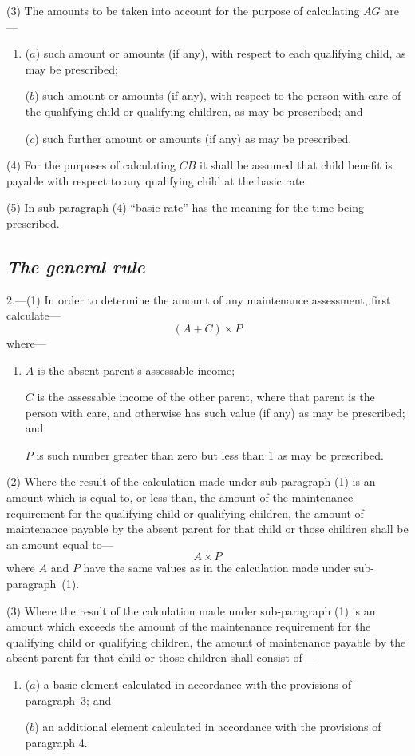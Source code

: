 \documentclass[12pt,a4paper]{article}
\begin{document}
(3) The amounts to be taken into account for the purpose of calculating $AG$ are—
\begin{enumerate}\item[]
($a$) such amount or amounts (if any), with respect to each qualifying child, as may be prescribed;

($b$) such amount or amounts (if any), with respect to the person with care of the qualifying child or qualifying children, as may be prescribed; and

($c$) such further amount or amounts (if any) as may be prescribed.
\end{enumerate}

(4) For the purposes of calculating $CB$ it shall be assumed that child benefit is payable with respect to any qualifying child at the basic rate.

(5) In sub-paragraph (4)  “basic rate” has the meaning for the time being prescribed.


\subsection*{\itshape The general rule}

2.---(1) In order to determine the amount of any maintenance assessment, first calculate—
\[
(A + C) \times P
\]
where—
\begin{enumerate}\item[]
    $A$ is the absent parent’s assessable income;

    $C$ is the assessable income of the other parent, where that parent is the person with care, and otherwise has such value (if any) as may be prescribed; and

    $P$ is such number greater than zero but less than 1 as may be prescribed. 
\end{enumerate}

(2) Where the result of the calculation made under sub-paragraph (1)  is an amount which is equal to, or less than, the amount of the maintenance requirement for the qualifying child or qualifying children, the amount of maintenance payable by the absent parent for that child or those children shall be an amount equal to—
\[
A \times P
\]
where $A$ and $P$ have the same values as in the calculation made under sub-paragraph~(1).

(3) Where the result of the calculation made under sub-paragraph (1)  is an amount which exceeds the amount of the maintenance requirement for the qualifying child or qualifying children, the amount of maintenance payable by the absent parent for that child or those children shall consist of—
\begin{enumerate}\item[]
($a$) a basic element calculated in accordance with the provisions of paragraph~3; and

($b$) an additional element calculated in accordance with the provisions of paragraph 4.
\end{enumerate}
\end{document}
